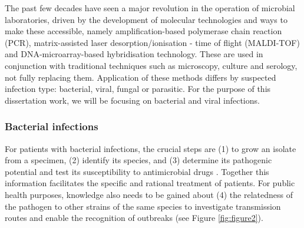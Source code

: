 The past few decades have seen a major revolution in the operation of microbial laboratories, driven by the development of molecular technologies and ways to make these accessible, namely amplification-based polymerase chain reaction (PCR), matrix-assisted laser desorption/ionisation - time of flight (MALDI-TOF) and DNA-microarray-based hybridisation technology. 
These are used in conjunction with traditional techniques such as microscopy, culture and serology, not fully replacing them.
Application of these methods differs by suspected infection type: bacterial, viral, fungal or parasitic. 
For the purpose of this dissertation work, we will be focusing on bacterial and viral infections.

\subsubsection{Bacterial infections} \label{sssec:bacterial}

For patients with bacterial infections, the crucial steps are (1) to grow an isolate from a specimen, (2) identify its species, and (3) determine its pathogenic potential and test its susceptibility to antimicrobial drugs  \citep{didelot_transforming_2012}. 
Together this information facilitates the specific and rational treatment of patients. 
For public health purposes, knowledge also needs to be gained about (4) the relatedness of the pathogen to other strains of the same species to investigate transmission routes and enable the recognition of outbreaks \citep{foxman_choosing_2005} (see Figure \ref{fig:figure2}). 

